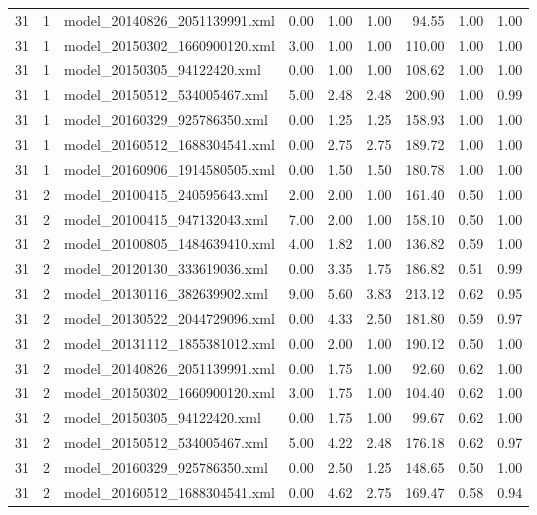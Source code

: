 \begin{table}[ht]
\begin{tabular}{rrlrrrrrr}
   31 &   1 & model\_20140826\_2051139991.xml & 0.00 & 1.00 & 1.00 & 94.55 & 1.00 & 1.00 \\ 
   31 &   1 & model\_20150302\_1660900120.xml & 3.00 & 1.00 & 1.00 & 110.00 & 1.00 & 1.00 \\ 
   31 &   1 & model\_20150305\_94122420.xml & 0.00 & 1.00 & 1.00 & 108.62 & 1.00 & 1.00 \\ 
   31 &   1 & model\_20150512\_534005467.xml & 5.00 & 2.48 & 2.48 & 200.90 & 1.00 & 0.99 \\ 
   31 &   1 & model\_20160329\_925786350.xml & 0.00 & 1.25 & 1.25 & 158.93 & 1.00 & 1.00 \\ 
   31 &   1 & model\_20160512\_1688304541.xml & 0.00 & 2.75 & 2.75 & 189.72 & 1.00 & 1.00 \\ 
   31 &   1 & model\_20160906\_1914580505.xml & 0.00 & 1.50 & 1.50 & 180.78 & 1.00 & 1.00 \\ 
   31 &   2 & model\_20100415\_240595643.xml & 2.00 & 2.00 & 1.00 & 161.40 & 0.50 & 1.00 \\ 
   31 &   2 & model\_20100415\_947132043.xml & 7.00 & 2.00 & 1.00 & 158.10 & 0.50 & 1.00 \\ 
   31 &   2 & model\_20100805\_1484639410.xml & 4.00 & 1.82 & 1.00 & 136.82 & 0.59 & 1.00 \\ 
   31 &   2 & model\_20120130\_333619036.xml & 0.00 & 3.35 & 1.75 & 186.82 & 0.51 & 0.99 \\ 
   31 &   2 & model\_20130116\_382639902.xml & 9.00 & 5.60 & 3.83 & 213.12 & 0.62 & 0.95 \\ 
   31 &   2 & model\_20130522\_2044729096.xml & 0.00 & 4.33 & 2.50 & 181.80 & 0.59 & 0.97 \\ 
   31 &   2 & model\_20131112\_1855381012.xml & 0.00 & 2.00 & 1.00 & 190.12 & 0.50 & 1.00 \\ 
   31 &   2 & model\_20140826\_2051139991.xml & 0.00 & 1.75 & 1.00 & 92.60 & 0.62 & 1.00 \\ 
   31 &   2 & model\_20150302\_1660900120.xml & 3.00 & 1.75 & 1.00 & 104.40 & 0.62 & 1.00 \\ 
   31 &   2 & model\_20150305\_94122420.xml & 0.00 & 1.75 & 1.00 & 99.67 & 0.62 & 1.00 \\ 
   31 &   2 & model\_20150512\_534005467.xml & 5.00 & 4.22 & 2.48 & 176.18 & 0.62 & 0.97 \\ 
   31 &   2 & model\_20160329\_925786350.xml & 0.00 & 2.50 & 1.25 & 148.65 & 0.50 & 1.00 \\ 
   31 &   2 & model\_20160512\_1688304541.xml & 0.00 & 4.62 & 2.75 & 169.47 & 0.58 & 0.94 \\ 

\end{tabular}
\end{table}
